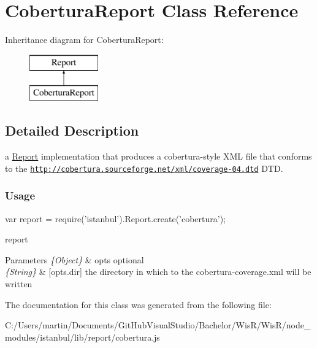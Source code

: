 \hypertarget{class_cobertura_report}{}\section{Cobertura\+Report Class Reference}
\label{class_cobertura_report}
Inheritance diagram for Cobertura\+Report\+:\begin{figure}[H]
\begin{center}
\leavevmode
\includegraphics[height=2.000000cm]{class_cobertura_report}
\end{center}
\end{figure}


\subsection{Detailed Description}
a {\ttfamily \hyperlink{class_report}{Report}} implementation that produces a cobertura-\/style X\+M\+L file that conforms to the \href{http://cobertura.sourceforge.net/xml/coverage-04.dtd}{\tt http\+://cobertura.\+sourceforge.\+net/xml/coverage-\/04.\+dtd} D\+T\+D.

\subsubsection*{Usage }

\begin{DoxyVerb} var report = require('istanbul').Report.create('cobertura');
\end{DoxyVerb}


report


\begin{DoxyParams}{Parameters}
{\em \{\+Object\}} & opts optional \\
\hline
{\em \{\+String\}} & \mbox{[}opts.\+dir\mbox{]} the directory in which to the cobertura-\/coverage.\+xml will be written \\
\hline
\end{DoxyParams}


The documentation for this class was generated from the following file\+:\begin{DoxyCompactItemize}
\item 
C\+:/\+Users/martin/\+Documents/\+Git\+Hub\+Visual\+Studio/\+Bachelor/\+Wis\+R/\+Wis\+R/node\+\_\+modules/istanbul/lib/report/cobertura.\+js\end{DoxyCompactItemize}
